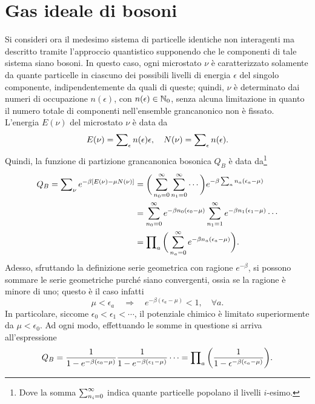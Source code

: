 \section{Gas ideale di bosoni}
Si consideri ora il medesimo sistema di particelle identiche non interagenti ma descritto tramite l'approccio quantistico supponendo che le componenti di tale sistema siano bosoni. In questo caso, ogni microstato $\nu$ è caratterizzato solamente da quante particelle in ciascuno dei possibili livelli di energia $\epsilon$ del singolo componente, indipendentemente da quali di queste; quindi, $\nu$ è determinato dai numeri di occupazione $n(\epsilon)$, con $n(\epsilon) \in \mathbb{N}_0$, senza alcuna limitazione in quanto il numero totale di componenti nell'ensemble grancanonico non è fissato. L'energia $E(\nu)$ del microstato $\nu$ è data da
\begin{equation}
    E(\nu) = \sum\nolimits_\epsilon n(\epsilon)\epsilon,\quad N(\nu) = \sum\nolimits_\epsilon n(\epsilon).
\end{equation}
Quindi, la funzione di partizione grancanonica bosonica $Q_B$ è data da\footnote{Dove la somma $\sum\nolimits_{n_i = 0}^\infty$ indica quante particelle popolano il livelli $i$-esimo.}
\begin{equation}
    \begin{split}
        Q_B = \sum\nolimits_\nu e^{-\beta[E(\nu) - \mu N(\nu)]} &= \bigg(\sum_{n_0 = 0}^\infty\sum_{n_1 = 0}^\infty \cdots\bigg)e^{-\beta\sum\nolimits_an_a(\epsilon_a - \mu)} \\
        &= \sum_{n_0 = 0}^\infty e^{-\beta n_0(\epsilon_0 - \mu)}\sum_{n_1 = 1}^\infty e^{-\beta n_1(\epsilon_1 - \mu)}\cdots \\
        &= \prod\nolimits_a\bigg(\sum_{n_a = 0}^\infty e^{-\beta n_a(\epsilon_a - \mu)}\bigg).
    \end{split}
\end{equation}
Adesso, sfruttando la definizione serie geometrica con ragione $e^{-\beta}$, si possono sommare le serie geometriche purché siano convergenti, ossia se la ragione è minore di uno; questo è il caso infatti
\begin{equation}
    \mu < \epsilon_a\quad\Longrightarrow\quad e^{-\beta(\epsilon_a - \mu)} < 1,\quad \forall a.
\end{equation}
In particolare, siccome $\epsilon_0 < \epsilon_1 < \cdots$, il potenziale chimico è limitato superiormente da $\mu < \epsilon_0$. Ad ogni modo, effettuando le somme in questione si arriva all'espressione
\begin{equation}
\label{eq: funzione di partizione grancanonica bosonica}
    Q_B = \frac{1}{1 - e^{-\beta(\epsilon_0 - \mu)}}\frac{1}{1 - e^{-\beta(\epsilon_1 - \mu)}}\cdots = \prod\nolimits_a\bigg(\frac{1}{1 - \epsilon^{-\beta(\epsilon_a - \mu)}}\bigg).
\end{equation}
